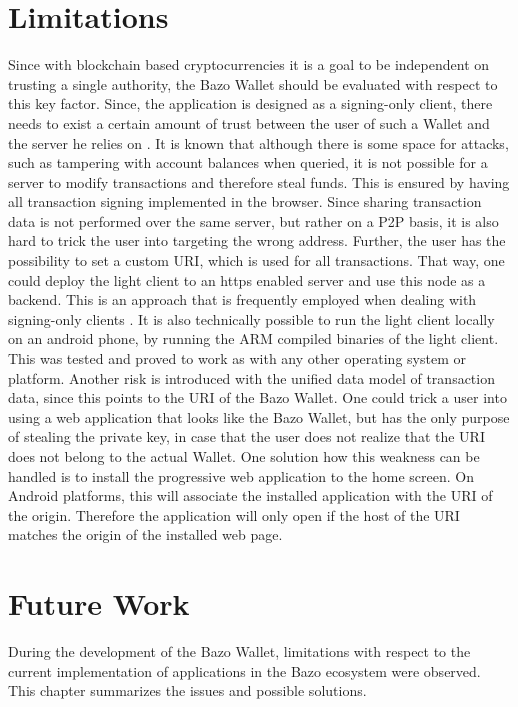 \section{Limitations}\label{limitations}
Since with blockchain based cryptocurrencies it is a goal to be independent on trusting a single authority, the Bazo Wallet should be evaluated with respect to this key factor.
Since, the application is designed as a signing-only client, there needs to exist a certain amount of trust between the user of such a Wallet and the server he relies on \cite{bitcoinclients}.
It is known that although there is some space for attacks, such as tampering with account balances when queried, it is not possible for a server to modify transactions and therefore steal funds. This is ensured by having all transaction signing implemented in the browser. Since sharing transaction data is not performed over the same server, but rather on a P2P basis, it is also hard to trick the user into targeting the wrong address. Further, the user has the possibility to set a custom URI, which is used for all transactions. That way, one could deploy the light client to an https enabled server and use this node as a backend. This is an approach that is frequently employed when dealing with signing-only clients \cite{bitcoinclients}. It is also technically possible to run the light client locally on an android phone, by running the ARM compiled binaries of the light client. This was tested and proved to work as with any other operating system or platform.
Another risk is introduced with the unified data model of transaction data, since this points to the URI of the Bazo Wallet. One could trick a user into using a web application that looks like the Bazo Wallet, but has the only purpose of stealing the private key, in case that the user does not realize that the URI does not belong to the actual Wallet.
One solution how this weakness can be handled is to install the progressive web application to the home screen. On Android platforms, this will associate the installed application with the URI of the origin. Therefore the application will only open if the host of the URI matches the origin of the installed web page.
\section{Future Work}
During the development of the Bazo Wallet, limitations with respect to the current implementation of applications in the Bazo ecosystem were observed. This chapter summarizes the issues and possible solutions.


